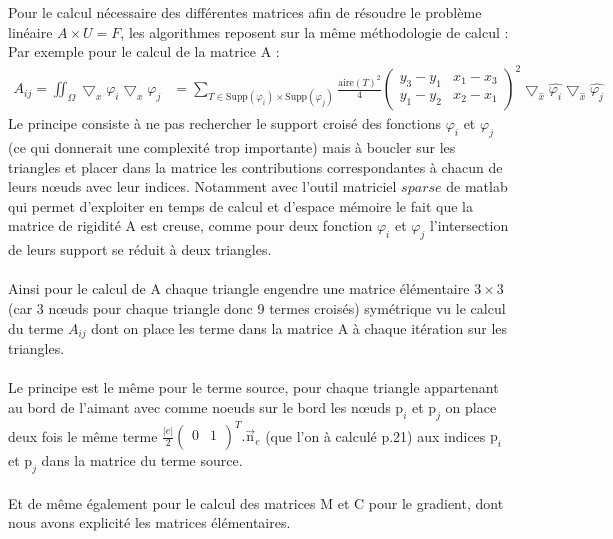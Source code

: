 \documentclass[a4paper,12pt,titlepage]{report}
\begin{document}
\begin{onehalfspace}
Pour le calcul nécessaire des différentes matrices afin de résoudre le problème linéaire $A\times U = F$, les algorithmes reposent sur la même méthodologie de calcul :
Par exemple pour le calcul de la matrice A : 
\[
\begin{aligned}
A_{ij} = 
	\iint_{\Omega}\bigtriangledown_{x}{\varphi_{i}} \bigtriangledown_{x}{\varphi_{j}} &= 
	\sum_{T \in \text{Supp}(\varphi_{i})\times \text{Supp}(\varphi_{j})}	
	\frac{\text{aire}(T)^{2}}{4}
	\begin{pmatrix}
   		y_{3}-y_{1} &  	x_{1}-x_{3}\\
   		y_{1}-y_{2} &  x_{2}-x_{1}
	\end{pmatrix}
	^{2}
	\bigtriangledown_{\hat{x}} \hat{\varphi_{i}}
	\bigtriangledown_{\hat{x}} \hat{\varphi_{j}}
\end{aligned}
\]
Le principe consiste à ne pas rechercher le support croisé des fonctions $\varphi_i$ et $\varphi_j$ (ce qui donnerait une complexité trop importante) mais à boucler sur les triangles et placer dans la matrice les contributions correspondantes à chacun de leurs nœuds avec leur indices. Notamment avec l'outil matriciel $sparse$ de matlab qui permet d'exploiter en temps de calcul et d'espace mémoire le fait que la matrice de rigidité A est creuse, comme pour deux fonction $\varphi_{i}$ et $\varphi_{j}$ l'intersection de leurs support se réduit à deux triangles.
\\
\\
Ainsi pour le calcul de A chaque triangle engendre une matrice élémentaire $ 3\times 3$ (car 3 nœuds pour chaque triangle donc 9 termes croisés) symétrique vu le calcul du terme $A_{ij}$ dont on place les terme dans la matrice A à chaque itération sur les triangles.
\\
\\Le principe est le même pour le terme source, pour chaque triangle appartenant au bord de l'aimant avec comme noeuds sur le bord les nœuds $\text{p}_{i}$ et  $\text{p}_{j}$ on place deux fois le même terme $\frac{|e|}{2}\begin{pmatrix} 
   									0 & 1\\
								\end{pmatrix}^{T}.
								\vec{\text{n}}_{e}$ 
(que l'on à calculé p.21) aux indices $\text{p}_{i}$ et  $\text{p}_{j}$ dans la matrice du terme source.
\\
\\
Et de même également pour le calcul des matrices M et C pour le gradient, dont nous avons explicité les matrices élémentaires.	


\end{onehalfspace}
\end{document}
